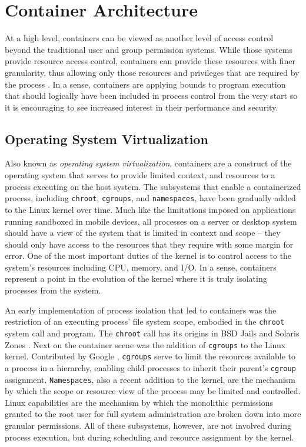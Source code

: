 \section{Container Architecture}
\label{sec:container_arch}
At a high level, containers can be viewed as another level of access control beyond the traditional user and group permission systems. 
While those systems provide resource access control, containers can provide these resources with finer granularity, thus allowing only those resources and privileges that are required by the process \autocite{_felter_1}. 
In a sense, containers are applying bounds to program execution that should logically have been included in process control from the very start so it is encouraging to see increased interest in their performance and security.

\subsection{Operating System Virtualization}
\label{sec:os_vt}
Also known as \emph{operating system virtualization}, containers are a construct of the operating system that serves to provide limited context, and resources to a process executing on the host system. 
The subsystems that enable a containerized process, including \texttt{chroot}, \texttt{cgroups}, and \texttt{namespaces}, have been gradually added to the Linux kernel over time.
Much like the limitations imposed on applications running sandboxed in mobile devices, all processes on a server or desktop system should have a view of the system that is limited in context and scope -- they should only have access to the resources that they require with some margin for error.  
One of the most important duties of the kernel is to control access to the system's resources including CPU, memory, and I/O.  
In a sense, containers represent a point in the evolution of the kernel where it is truly isolating processes from the system. 

An early implementation of process isolation that led to containers was the restriction of an executing process' file system scope, embodied in the \texttt{chroot} system call and program. 
The \texttt{chroot} call has its origins in BSD Jails and Solaris Zones \autocite{_zones_1}.
Next on the container scene was the addition of \texttt{cgroups} to the Linux kernel.  Contributed by Google \autocite{googlecgroups}, \texttt{cgroups} serve to limit the resources available to a process in a hierarchy, enabling child processes to inherit their parent's \texttt{cgroup} assignment. 
\texttt{Namespaces}, also a recent addition to the kernel, are the mechanism by which the scope or resource view of the process may be limited and controlled.
Linux capabilities are the mechanism by which the monolithic permissions granted to the root user for full system administration are broken down into more granular permissions.  
All of these subsystems, however, are not involved during process execution, but during scheduling and resource assignment by the kernel.  

